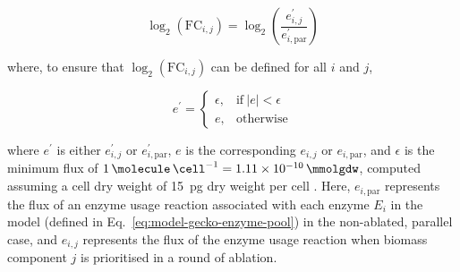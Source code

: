 \begin{equation}
  \log_{2}(\mathrm{FC}_{i,j}) = \log_{2}\left( \frac{e_{i,j}^{\prime}}{e_{i, \mathrm{par}}^{\prime}} \right)
  \label{eq:model-foldchange}
\end{equation}

where, to ensure that $\log_{2}(\mathrm{FC}_{i,j})$ can be defined for all $i$ and $j$,

\begin{equation}
  e^{\prime} =
  \begin{cases}
    \epsilon, & \text{if}\ |e|<\epsilon \\
    e, & \text{otherwise}
  \end{cases}
  \label{eq:model-epsilon-round}
\end{equation}

where $e^{\prime}$ is either $e_{i,j}^{\prime}$ or $e_{i, \mathrm{par}}^{\prime}$, $e$ is the corresponding $e_{i,j}$ or $e_{i, \mathrm{par}}$, and $\epsilon$ is the minimum flux of $\SI{1}{\molecule~\cell^{-1}} = \SI{1.11d-10}{\mmolgdw}$, computed assuming a cell dry weight of \SI{15}{\pico\gram} dry weight per cell \parencite{shermanGettingStartedYeast2002}.
Here, $e_{i, \mathrm{par}}$ represents the flux of an enzyme usage reaction associated with each enzyme $E_{i}$ in the model (defined in Eq.\ \ref{eq:model-gecko-enzyme-pool}) in the non-ablated, parallel case, and $e_{i,j}$ represents the flux of the enzyme usage reaction when biomass component $j$ is prioritised in a round of ablation.





